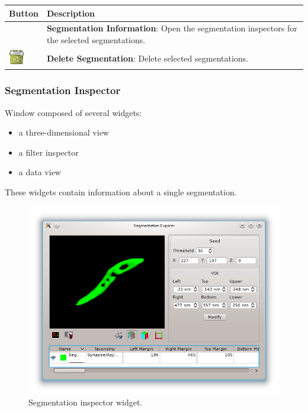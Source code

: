 \begin{tabular}{| m{1.3cm} | m{12cm} |}
\hline
\textbf{Button} & \textbf{Description}\\
\hline
 & %
\textbf{Segmentation Information}: Open the segmentation inspectors for the
selected segmentations.\\
\hline
\includegraphics[width=0.7cm]{../../frontend/rsc/trash-full} &
\textbf{Delete Segmentation}: Delete selected segmentations.\\
\hline
\end{tabular}
\vspace{0.3cm}

\subsubsection{Segmentation Inspector}

Window composed of several widgets:
\begin{itemize}
\item a three-dimensional view
\item a filter inspector 
\item a data view
\end{itemize}
These widgets contain information about a single segmentation.

\begin{figure}[H]
\centering
\includegraphics[width=\linewidth]{fig/SegmentationInspector}
\caption{Segmentation inspector widget.}
\end{figure}

